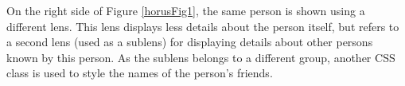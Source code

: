 

On the right side of Figure \ref{horusFig1}, the same person is shown using a different lens. This lens displays less details about the person itself, but refers to a second lens (used as a sublens) for displaying details about other persons known by this person. As the sublens belongs to a different group, another CSS class is used to style the names of the person's friends.
